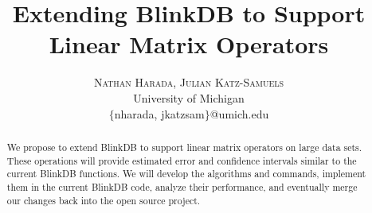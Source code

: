 \documentclass[twoside]{article}
\title{\vspace{-15mm}\fontsize{24pt}{10pt}\selectfont\textbf{Extending BlinkDB to Support Linear Matrix Operators}} %
\author{
\large
\textsc{Nathan Harada, Julian Katz-Samuels}\\[2mm] %
\normalsize University of Michigan \\ %
\normalsize $\{$nharada, jkatzsam$\}$@umich.edu
\vspace{-5mm}
}
\date{}
\begin{document}
\maketitle %

\thispagestyle{fancy} %


\begin{abstract}

We propose to extend BlinkDB to support linear matrix operators on large data sets. These operations will provide estimated error and confidence intervals similar to the current BlinkDB functions. We will develop the algorithms and commands, implement them in the current BlinkDB code, analyze their performance, and eventually merge our changes back into the open source project.

\end{abstract}

\end{document}
